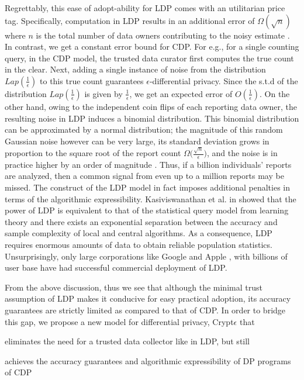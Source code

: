  \par Regrettably, this ease of adopt-ability for \textsf{LDP} comes with an utilitarian price tag. Specifically, computation in \textsf{LDP} results in an additional error of $\Omega(\sqrt{n})$ where $n$ is the total number of data owners contributing to the noisy estimate \cite{error1,error2,error3}. In contrast, we get a constant error bound for \textsf{CDP}.
For e.g., for a single counting query, in the \textsf{CDP} model, the trusted data curator first computes the true count in the clear. Next, adding a single instance of noise from the distribution $Lap(\frac{1}{\epsilon})$ to this true count guarantees $\epsilon$-differential privacy. Since the s.t.d of the distribution $Lap(\frac{1}{\epsilon})$ is given by $\frac{1}{\epsilon}$, we get an expected error of $O(\frac{1}{\epsilon})$. On the other hand, owing to the independent coin flips of each reporting data owner, the resulting noise in \textsf{LDP} induces a binomial distribution. This binomial distribution can be approximated by a normal distribution; the magnitude of this random Gaussian
noise however can be very large, its
standard deviation grows in proportion to the square root of
the report count $ \Omega\big(\frac{\sqrt{n}}{\epsilon}\big)$, and the noise is in practice higher by an
order of magnitude \cite{Prochlo,Rappor1,Rappor2,LDP1}. %
 Thus, if a billion individuals'
reports are analyzed, then a common signal from even
up to a million reports may be missed. The construct of the \textsf{LDP} model in fact imposes additional penalties in terms of the  algorithmic expressibility.  Kasiviswanathan et al. in \cite{Kasivi} showed that the power of \textsf{LDP} is equivalent to that of the statistical query model \cite{SQ1} from learning theory and there exists an exponential separation between the accuracy and sample complexity of local and central algorithms.  As a consequence, \textsf{LDP} requires enormous amounts of data \cite{Kasivi}
to obtain reliable population statistics. Unsurprisingly, only large corporations  like Google \cite{Rappor1,Rappor2,Prochlo} and Apple \cite{Apple}, with  billions of user base have had successful commercial deployment of \textsf{LDP}. %
\par From the above discussion, thus we see that although the minimal trust assumption of \textsf{LDP} makes it conducive for easy practical adoption, its accuracy guarantees are strictly limited as compared to that of \textsf{CDP}. In order to bridge this gap, we propose a new model for differential privacy, Crypt$\epsilon$ that \squishlistnum \item eliminates the need for a trusted data collector like in \textsf{LDP}, but still \item achieves the accuracy guarantees and algorithmic expressibility of DP programs of \textsf{CDP} \squishendnum 
